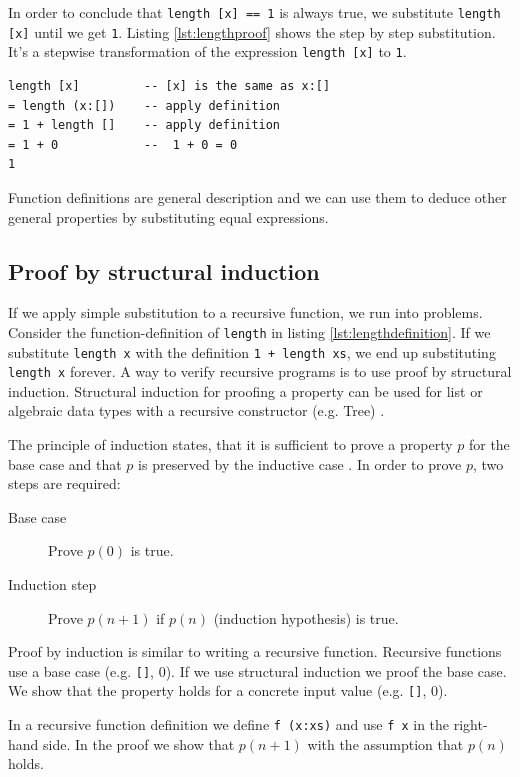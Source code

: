 In order to conclude that \verb|length [x] == 1| is always true, we substitute \verb|length [x]| until we get \verb|1|. Listing \ref{lst:lengthproof} shows the step by step substitution. It's a stepwise transformation of the expression \verb|length [x]| to \verb|1|.
\begin{lstlisting}[caption={step by step substitution of {\ttfamily length}},label={lst:lengthproof}]
length [x]         -- [x] is the same as x:[]
= length (x:[])    -- apply definition
= 1 + length []    -- apply definition
= 1 + 0            --  1 + 0 = 0
1
\end{lstlisting}
Function definitions are general description and we can use them to deduce other general properties by substituting equal expressions.

\subsection{Proof by structural induction}
\label{sec:induction}

If we apply simple substitution to a recursive function, we run into problems.
Consider the \gls{function-definition} of \verb|length| in listing \ref{lst:lengthdefinition}.
If we substitute \verb|length x| with the definition \verb|1 + length xs|, we end up substituting \verb|length x| forever. A way to verify recursive programs is to use proof by structural induction.  
Structural induction for proofing a property can be used for list or algebraic data types with a recursive constructor (e.g. Tree) \cite{Thompson}.

 The principle of induction states, that it is sufficient to prove a property $p$ for the base case and that $p$ is preserved by the inductive case \cite{Doets}. In order to prove $p$, two steps are required:
 \begin{description}
 \item[Base case] Prove $p(0)$ is true.
 \item[Induction step] Prove $p(n+1)$ if $p(n)$ (induction hypothesis) is true.
 \end{description}

Proof by induction is similar to writing a recursive function. Recursive functions use a base case (e.g. \verb|[]|, 0). 
If we use structural induction we proof the base case. We show that the property holds for a concrete input value (e.g. \verb|[]|, 0). 

In a recursive function definition we define \verb|f (x:xs)| and use \verb|f x| in the right-hand side. In the proof we show that $p(n+1)$ with the assumption that $p(n)$ holds.

